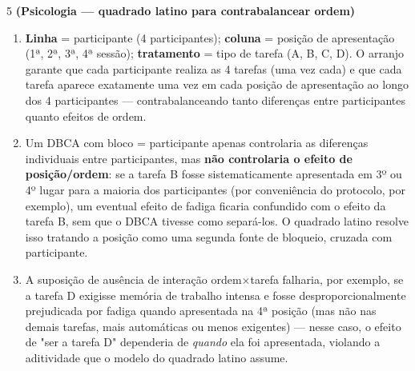 \documentclass[11pt]{article}
\begin{document}
\begin{questao}{5} \textbf{(Psicologia --- quadrado latino para contrabalancear ordem)}
\end{questao}
\begin{solucao}
\begin{enumerate}[label=(\alph*)]
  \item \textbf{Linha} = participante (4 participantes); \textbf{coluna} = posição de
    apresentação (1ª, 2ª, 3ª, 4ª sessão); \textbf{tratamento} = tipo de tarefa (A, B, C, D). O
    arranjo garante que cada participante realiza as 4 tarefas (uma vez cada) e que cada tarefa
    aparece exatamente uma vez em cada posição de apresentação ao longo dos 4 participantes —
    contrabalanceando tanto diferenças entre participantes quanto efeitos de ordem.
  \item Um DBCA com bloco = participante apenas controlaria as diferenças individuais entre
    participantes, mas \textbf{não controlaria o efeito de posição/ordem}: se a tarefa B fosse
    sistematicamente apresentada em 3º ou 4º lugar para a maioria dos participantes (por
    conveniência do protocolo, por exemplo), um eventual efeito de fadiga ficaria confundido com
    o efeito da tarefa B, sem que o DBCA tivesse como separá-los. O quadrado latino resolve isso
    tratando a posição como uma segunda fonte de bloqueio, cruzada com participante.
  \item A suposição de ausência de interação ordem$\times$tarefa falharia, por exemplo, se a
    tarefa D exigisse memória de trabalho intensa e fosse desproporcionalmente prejudicada por
    fadiga quando apresentada na 4ª posição (mas não nas demais tarefas, mais automáticas ou menos
    exigentes) — nesse caso, o efeito de "ser a tarefa D" dependeria de \emph{quando} ela foi
    apresentada, violando a aditividade que o modelo do quadrado latino assume.
\end{enumerate}
\end{solucao}
\end{document}
